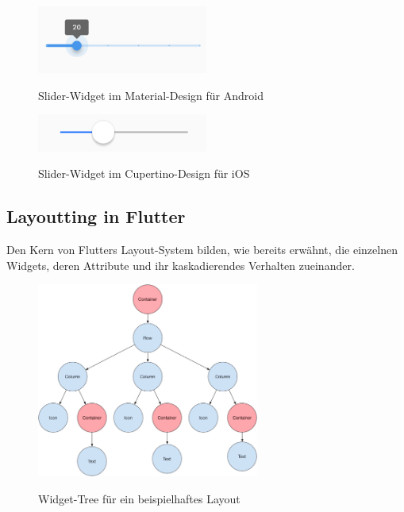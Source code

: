 \begin{figure}[H]
    \begin{center}
        \includegraphics[width=0.5\textwidth]{images/Flutter/material-slider.png}
        \caption{Slider-Widget im Material-Design für Android}
        \cite{flutterMaterialSlider}
    \end{center}
\end{figure}

\begin{figure}[H]
    \begin{center}
        \includegraphics[width=0.5\textwidth]{images/Flutter/cupertino-slider.png}
        \caption{Slider-Widget im Cupertino-Design für iOS}
        \cite{flutterCupertinoSlider}
    \end{center}
\end{figure}

\subsection{Layoutting in Flutter}

Den Kern von Flutters Layout-System bilden, wie bereits erwähnt, die einzelnen Widgets, deren Attribute und ihr
kaskadierendes Verhalten zueinander.

\begin{figure}[H]
    \begin{center}
        \includegraphics[width=0.65\textwidth]{images/Flutter/widget-tree.png}
        \caption{Widget-Tree für ein beispielhaftes Layout}
        \cite{flutterWidgetTree}
    \end{center}
\end{figure}


